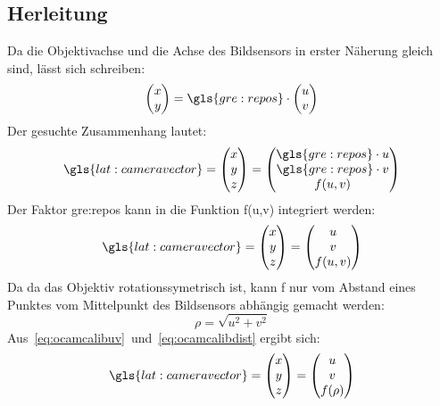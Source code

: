 \subsection{Herleitung}
Da die Objektivachse und die Achse des Bildsensors in erster Näherung gleich sind, lässt sich schreiben:
\begin{equation}
\begin{pmatrix}
x \\ y
\end{pmatrix}
= \gls{gre:repos} \cdot
\begin{pmatrix}
u \\ v
\end{pmatrix}
\end{equation}
Der gesuchte Zusammenhang lautet: 
\begin{equation}
\gls{lat:cameravector} =
\begin{pmatrix}
x \\ y \\ z
\end{pmatrix}
=
\begin{pmatrix}
\gls{gre:repos} \cdot u \\  \gls{gre:repos} \cdot v \\ f(u,v)
\end{pmatrix}
\end{equation}
Der Faktor  \gls{gre:repos} kann in die Funktion f(u,v) integriert werden:
\begin{equation}
\label{eq:ocamcalibuv}
\gls{lat:cameravector} =
\begin{pmatrix}
x \\ y \\ z
\end{pmatrix}
=
\begin{pmatrix}
 u \\  v \\ f(u,v)
\end{pmatrix}
\end{equation}
Da da das Objektiv rotationssymetrisch ist, kann f nur vom Abstand eines Punktes vom Mittelpunkt des Bildsensors abhängig gemacht werden:
\begin{equation}
\label{eq:ocamcalibdist}
\rho=\sqrt{u^2+v^2}
\end{equation}
Aus~\eqref{eq:ocamcalibuv}~und~\eqref{eq:ocamcalibdist} ergibt sich: 
\begin{equation}
\label{eq:ocamcalibfin}
\gls{lat:cameravector} =
\begin{pmatrix}
x \\ y \\ z
\end{pmatrix}
=
\begin{pmatrix}
 u \\  v \\ f(\rho)
\end{pmatrix}
\end{equation}
